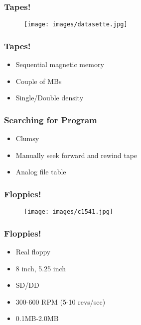 \documentclass[aspectratio=43]{uva-inf-presentation}
\begin{document}

\begin{frame}
\frametitle{Tapes!}

\begin{figure}
\texttt{[image: images/datasette.jpg]}
\end{figure}

\end{frame}


\begin{frame}
\frametitle{Tapes!}

\begin{itemize}
\item Sequential magnetic memory
\item Couple of MBs
\item Single/Double density
\end{itemize}

\end{frame}


\begin{frame}
\frametitle{Searching for Program}

\begin{itemize}
\item Clumsy
\item Manually seek forward and rewind tape
\item Analog file table
\end{itemize}

\end{frame}


\begin{frame}
\frametitle{Floppies!}

\begin{figure}
\texttt{[image: images/c1541.jpg]}
\end{figure}

\end{frame}


\begin{frame}
\frametitle{Floppies!}

\begin{itemize}
\item Real floppy
\item 8 inch, 5.25 inch
\item SD/DD
\item 300-600 RPM (5-10 revs/sec)
\item 0.1MB-2.0MB
\end{itemize}

\end{frame}
\end{document}
